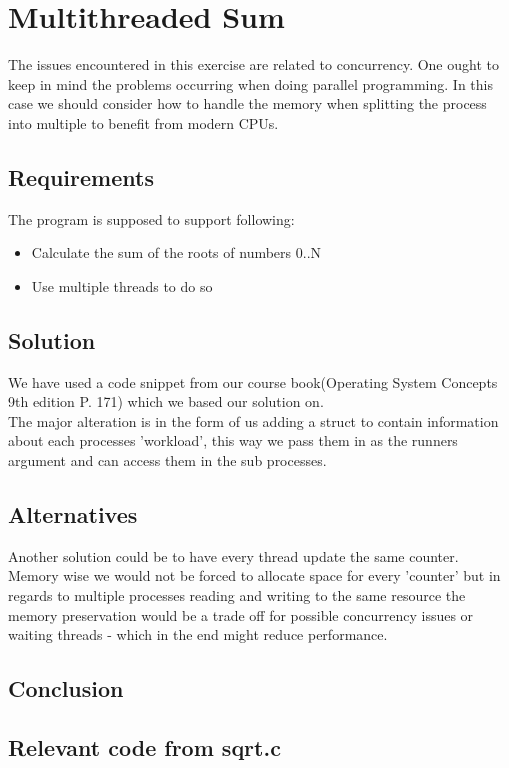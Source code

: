 \chapter{Multithreaded Sum}
The issues encountered in this exercise are related to concurrency. One ought to keep in mind the problems occurring when doing parallel programming. In this case we should consider how to handle the memory when splitting the process into multiple to benefit from modern CPUs. 

\section{Requirements}
The program is supposed to support following:
\begin{itemize}
\item Calculate the sum of the roots of numbers 0..N
\item Use multiple threads to do so
\end{itemize}

\section{Solution}
We have used a code snippet from our course book(Operating System Concepts 9th edition P. 171) which we based our solution on.\\

The major alteration is in the form of us adding a struct to contain information about each processes 'workload', this way we pass them in as the runners argument and can access them in the sub processes.\\

\section{Alternatives}
Another solution could be to have every thread update the same counter. Memory wise we would not be forced to allocate space for every 'counter' but in regards to multiple processes reading and writing to the same resource the memory preservation would be a trade off for possible concurrency issues or waiting threads - which in the end might reduce performance.

\section{Conclusion}


\section{Relevant code from sqrt.c}
